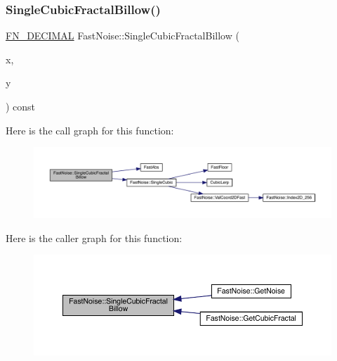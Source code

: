 \subsubsection{\texorpdfstring{Single\+Cubic\+Fractal\+Billow()}{SingleCubicFractalBillow()}\hspace{0.1cm}{\footnotesize\ttfamily [1/2]}}
{\footnotesize\ttfamily \mbox{\hyperlink{_fast_noise_8h_a75a9ef6d2541c4921815b885bfd449c3}{F\+N\+\_\+\+D\+E\+C\+I\+M\+AL}} Fast\+Noise\+::\+Single\+Cubic\+Fractal\+Billow (\begin{DoxyParamCaption}\item[{\mbox{\hyperlink{_fast_noise_8h_a75a9ef6d2541c4921815b885bfd449c3}{F\+N\+\_\+\+D\+E\+C\+I\+M\+AL}}}]{x,  }\item[{\mbox{\hyperlink{_fast_noise_8h_a75a9ef6d2541c4921815b885bfd449c3}{F\+N\+\_\+\+D\+E\+C\+I\+M\+AL}}}]{y }\end{DoxyParamCaption}) const\hspace{0.3cm}{\ttfamily [private]}}

Here is the call graph for this function\+:
\nopagebreak
\begin{figure}[H]
\begin{center}
\leavevmode
\includegraphics[width=350pt]{d1/dd8/class_fast_noise_a679b755d2540f9c26cb1d978f92fbef2_cgraph}
\end{center}
\end{figure}
Here is the caller graph for this function\+:
\nopagebreak
\begin{figure}[H]
\begin{center}
\leavevmode
\includegraphics[width=350pt]{d1/dd8/class_fast_noise_a679b755d2540f9c26cb1d978f92fbef2_icgraph}
\end{center}
\end{figure}
\mbox{\label{class_fast_noise_a8595f37169b6133ccd822d21af3acd60}} 
